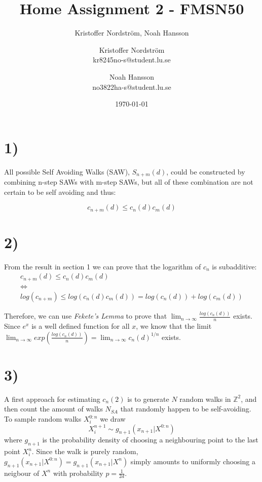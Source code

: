 \documentclass[a4paper]{article}
\title{Home Assignment 2 - FMSN50}
\author{Kristoffer Nordström, Noah Hansson}\author{Kristoffer Nordström \\ kr8245no-s@student.lu.se \and  Noah Hansson \\ no3822ha-s@student.lu.se}
\date{\today}
\begin{document}
\maketitle
\newpage

\section*{1)}

All possible Self Avoiding Walks (SAW), $S_{n+m}(d)$, could be constructed by combining n-step SAWs with m-step SAWs, but all of these combination are not certain to
 be self avoiding and thus:

\begin{equation}
    \label{eq:multiplicity}
    c_{n+m}(d)\leq c_n(d)c_m(d)
\end{equation}

\section*{2)}
From the result in section 1 we can prove that the logarithm of $c_n$ is subadditive:
\begin{equation}
    \begin{gathered}
        c_{n+m}(d) \leq c_n(d)c_m(d) \\
        \iff \\
        log(c_{n+m}) \leq log(c_n(d)c_m(d)) = log(c_n(d)) + log(c_m(d))
    \end{gathered}
\end{equation}

Therefore, we can use \textit{Fekete's Lemma} to prove that $\lim_{n\rightarrow\infty} \frac{log(c_n(d))}{n}$ exists. Since $e^x$ is a well defined function for all $x$, we know that the limit $\lim_{n\rightarrow\infty} exp(\frac{log(c_n(d))}{n}) = \lim_{n\rightarrow\infty} c_n(d)^{1/n}$ exists. 

\section*{3)}
A first approach for estimating $c_n(2)$ is to generate $N$ random walks in $\mathbb{Z}^2$, and then count the amount of walks $N_{SA}$ that randomly happen to be self-avoiding. To sample random walks $X_i^{0:n}$ we draw 
\begin{equation}
    X_i^{n+1} \sim g_{n+1}(x_{n+1}|X^{0:n})
\end{equation}
where $g_{n+1}$ is the probability density of choosing a neighbouring point to the last point $X_i^n$. Since the walk is purely random, $g_{n+1}(x_{n+1}|X^{0:n}) = g_{n+1}(x_{n+1}|X^n)$ simply amounts to uniformly choosing a neigbour of $X^n$ with probability $p = \frac{1}{2d}$.
\end{document}
